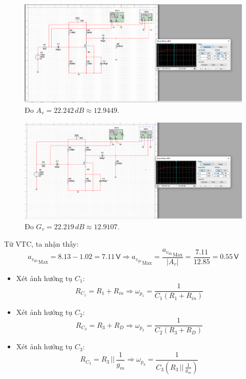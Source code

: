 \begin{figure}[H]
	\centering
	\includegraphics[width=\linewidth]{./my-chapters/my-images/Question1/Câu 1 Hình 1 b - Av.png}
	\caption{Đo $A_{v} = 22.242\,dB \approx 12.9449$.}
\end{figure}

\begin{figure}[H]
	\centering
	\includegraphics[width=\linewidth]{./my-chapters/my-images/Question1/Câu 1 Hình 1 b - Gv.png}
	\caption{Đo $G_{v} = 22.219\, dB \approx 12.9107$.}
\end{figure}
Từ VTC, ta nhận thấy:
\[
{a_{v_{ds}}}_{\text{Max}}=8.13-1.02=7.11\,\textsf{V}
\Rightarrow {a_{v_{gs}}}_{\text{Max}}=\frac{{a_{v_{ds}}}_{\text{Max}}}{\left|A_{v}\right|}=\frac{7.11}{12.85}=0.55\,\textsf{V}
\]


\begin{itemize}[label=-]
	\item Xét ảnh hưởng tụ $C_{1}$: 
	\[
	R_{C_{1}}=R_{1}+R_{in}
	\Longrightarrow \omega_{p_{1}}=\frac{1}{C_{1}(R_{1}+R_{in})}
	\]
	
	\item Xét ảnh hưởng tụ $C_{2}$: 
	\[
	R_{C_{2}}=R_{3}+R_{D}
	\Longrightarrow \omega_{p_{2}}=\frac{1}{C_{2}(R_{3}+R_{D})}
	\]
	
	\item Xét ảnh hưởng tụ $C_{3}$: 
	\[
	R_{C_{3}}=R_{3}\,||\,\frac{1}{g_{m}}
	\Longrightarrow \omega_{p_{3}}=\frac{1}{C_{3}\left(R_{3}\,||\,\frac{1}{g_{m}}\right)}
	\]
\end{itemize}

